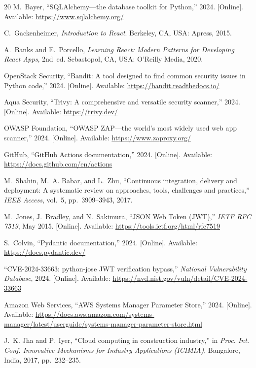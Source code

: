 \documentclass[conference]{IEEEtran}
\begin{document}
\begin{thebibliography}{20}
M.~Bayer, ``SQLAlchemy---the database toolkit for Python,'' 2024. [Online]. Available: \url{https://www.sqlalchemy.org/}

C.~Gackenheimer, \textit{Introduction to React}. Berkeley, CA, USA: Apress, 2015.

A.~Banks and E.~Porcello, \textit{Learning React: Modern Patterns for Developing React Apps}, 2nd~ed. Sebastopol, CA, USA: O'Reilly Media, 2020.

OpenStack Security, ``Bandit: A tool designed to find common security issues in Python code,'' 2024. [Online]. Available: \url{https://bandit.readthedocs.io/}

Aqua Security, ``Trivy: A comprehensive and versatile security scanner,'' 2024. [Online]. Available: \url{https://trivy.dev/}

OWASP Foundation, ``OWASP ZAP---the world's most widely used web app scanner,'' 2024. [Online]. Available: \url{https://www.zaproxy.org/}

GitHub, ``GitHub Actions documentation,'' 2024. [Online]. Available: \url{https://docs.github.com/en/actions}

M.~Shahin, M.~A. Babar, and L.~Zhu, ``Continuous integration, delivery and deployment: A systematic review on approaches, tools, challenges and practices,'' \textit{IEEE Access}, vol.~5, pp.~3909--3943, 2017.

M.~Jones, J.~Bradley, and N.~Sakimura, ``JSON Web Token (JWT),'' \textit{IETF RFC 7519}, May 2015. [Online]. Available: \url{https://tools.ietf.org/html/rfc7519}

S.~Colvin, ``Pydantic documentation,'' 2024. [Online]. Available: \url{https://docs.pydantic.dev/}

``CVE-2024-33663: python-jose JWT verification bypass,'' \textit{National Vulnerability Database}, 2024. [Online]. Available: \url{https://nvd.nist.gov/vuln/detail/CVE-2024-33663}

Amazon Web Services, ``AWS Systems Manager Parameter Store,'' 2024. [Online]. Available: \url{https://docs.aws.amazon.com/systems-manager/latest/userguide/systems-manager-parameter-store.html}

J.~K. Jha and P.~Iyer, ``Cloud computing in construction industry,'' in \textit{Proc. Int. Conf. Innovative Mechanisms for Industry Applications (ICIMIA)}, Bangalore, India, 2017, pp.~232--235.

\end{thebibliography}

\balance
\end{document}
